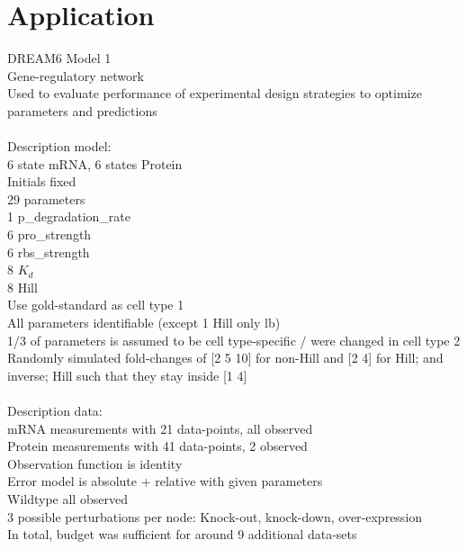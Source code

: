 \documentclass{bioinfo}
\begin{document}

\section{Application}
DREAM6 Model 1\\
Gene-regulatory network\\
Used to evaluate performance of experimental design strategies to optimize parameters and predictions\\ \\
Description model:\\
6 state mRNA, 6 states Protein\\
Initials fixed\\
29 parameters\\
1 p\_degradation\_rate\\
6 pro\_strength\\
6 rbs\_strength\\
8 $K_d$\\
8 Hill\\
Use gold-standard as cell type 1\\
All parameters identifiable (except 1 Hill only lb)\\
1/3 of parameters is assumed to be cell type-specific / were changed in cell type 2\\
Randomly simulated fold-changes of [2 5 10] for non-Hill and [2 4] for Hill; and inverse; Hill such that they stay inside [1 4]\\ \\
Description data:\\
mRNA measurements with 21 data-points, all observed\\
Protein measurements with 41 data-points, 2 observed\\
Observation function is identity\\
Error model is absolute + relative with given parameters\\
Wildtype all observed\\
3 possible perturbations per node: Knock-out, knock-down, over-expression\\
In total, budget was sufficient for around 9 additional data-sets\\
\end{document}
